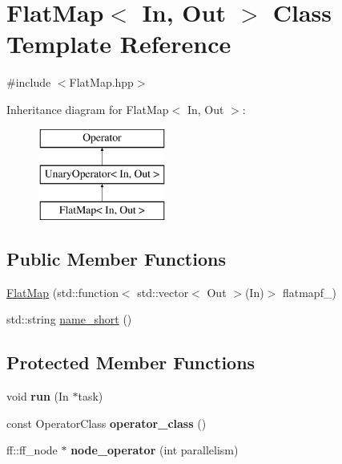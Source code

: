 \hypertarget{class_flat_map}{\section{\-Flat\-Map$<$ \-In, \-Out $>$ \-Class \-Template \-Reference}
\label{class_flat_map}
}


{\ttfamily \#include $<$\-Flat\-Map.\-hpp$>$}

\-Inheritance diagram for \-Flat\-Map$<$ \-In, \-Out $>$\-:\begin{figure}[H]
\begin{center}
\leavevmode
\includegraphics[height=3.000000cm]{class_flat_map}
\end{center}
\end{figure}
\subsection*{\-Public \-Member \-Functions}
\begin{DoxyCompactItemize}
\item 
\hyperlink{class_flat_map_a8ec8c425acf80cf2577b434b195904bd}{\-Flat\-Map} (std\-::function$<$ std\-::vector$<$ \-Out $>$(\-In)$>$ flatmapf\-\_\-)
\item 
std\-::string \hyperlink{class_flat_map_ae5ead8986dd0847b81a65c4857e856c7}{name\-\_\-short} ()
\end{DoxyCompactItemize}
\subsection*{\-Protected \-Member \-Functions}
\begin{DoxyCompactItemize}
\item 
\hypertarget{class_flat_map_ac02777613b25e9fcf563d3060a9fde26}{void {\bfseries run} (\-In $\ast$task)}\label{class_flat_map_ac02777613b25e9fcf563d3060a9fde26}

\item 
\hypertarget{class_flat_map_a448c6f98264a251bb8fb691c94bf2556}{const \-Operator\-Class {\bfseries operator\-\_\-class} ()}\label{class_flat_map_a448c6f98264a251bb8fb691c94bf2556}

\item 
\hypertarget{class_flat_map_a378bde7e4f8d5f63dd9f8e158547a4c0}{ff\-::ff\-\_\-node $\ast$ {\bfseries node\-\_\-operator} (int parallelism)}\label{class_flat_map_a378bde7e4f8d5f63dd9f8e158547a4c0}

\end{DoxyCompactItemize}
